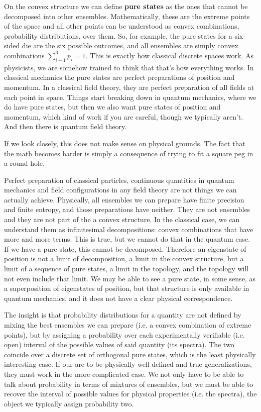 \documentclass[10pt,twocolumn, nofootinbib]{revtex4-2}
\begin{document}
On the convex structure we can define \textbf{pure states} as the ones that cannot be decomposed into other ensembles. Mathematically, these are the extreme points of the space and all other points can be understood as convex combinations, probability distributions, over them. So, for example, the pure states for a six-sided die are the six possible outcomes, and all ensembles are simply convex combinations $\sum_{i+1}^{6} p_i = 1$. This is exactly how classical discrete spaces work. As physicists, we are somehow trained to think that that's how everything works. In classical mechanics the pure states are perfect preparations of position and momentum. In a classical field theory, they are perfect preparation of all fields at each point in space. Things start breaking down in quantum mechanics, where we do have pure states, but then we also want pure states of position and momentum, which kind of work if you are careful, though we typically aren't. And then there is quantum field theory.

If we look closely, this does not make sense on physical grounds. The fact that the math becomes harder is simply a consequence of trying to fit a square peg in a round hole.

Perfect preparation of classical particles, continuous quantities in quantum mechanics and field configurations in any field theory are not things we can actually achieve. Physically, all ensembles we can prepare have finite precision and finite entropy, and those preparations have neither. They are not ensembles and they are not part of the a convex structure. In the classical case, we can understand them as infinitesimal decompositions: convex combinations that have more and more terms. This is true, but we cannot do that in the quantum case. If we have a pure state, this cannot be decomposed. Therefore an eigenstate of position is not a limit of decomposition, a limit in the convex structure, but a limit of a sequence of pure states, a limit in the topology, and the topology will not even include that limit. We may be able to see a pure state, in some sense, as a superposition of eigenstates of position, but that structure is only available in quantum mechanics, and it does not have a clear physical correspondence.

The insight is that probability distributions for a quantity are not defined by mixing the best ensembles we can prepare (i.e. a convex combination of extreme points), but by assigning a probability over each experimentally verifiable (i.e. open) interval of the possible values of said quantity (its spectra). The two coincide over a discrete set of orthogonal pure states, which is the least physically interesting case. If our are to be physically well defined and true generalizations, they must work in the more complicated case. We not only have to be able to talk about probability in terms of mixtures of ensembles, but we must be able to recover the interval of possible values for physical properties (i.e. the spectra), the object we typically assign probability two.
\end{document}
